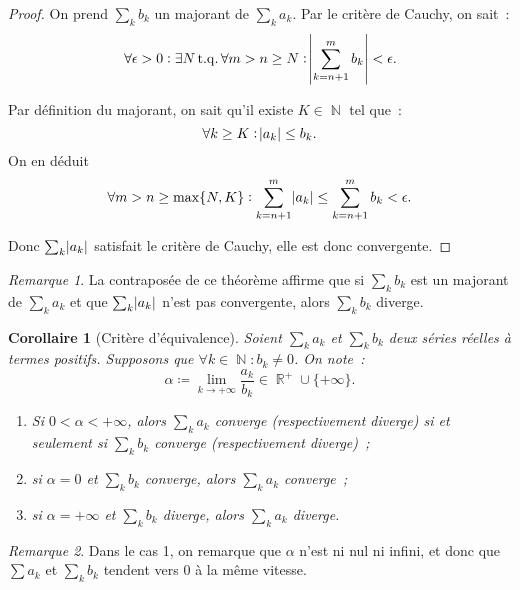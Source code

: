 \documentclass{article}
\DeclareMathOperator{\N}{\mathbb N}
\DeclareMathOperator{\R}{\mathbb R}
\DeclareMathOperator{\tq}{ t.q. }
\newtheorem{cor}[thm]{Corollaire}
\theoremstyle{definition}
\theoremstyle{remark}
\newtheorem*{rmq}{Remarque}
\begin{document}
		\begin{proof} On prend $\sum_k b_k$ un majorant de $\sum_k a_k$. Par le critère de Cauchy, on sait~:
		\[\forall \epsilon > 0 : \exists N \tq \forall m > n \geq N : \abs {\sum_{k=n+1}^m b_k} < \epsilon.\]

		Par définition du majorant, on sait qu'il existe $K \in \N$ tel que~:
		\[\forall k \geq K : \abs {a_k} \leq b_k.\]
		On en déduit
		\[\forall m > n \geq \max \{N, K\} : \sum_{k=n+1}^m \abs {a_k} \leq \sum_{k=n+1}^m b_k < \epsilon.\]

		Donc $\sum_k \abs {a_k}$ satisfait le critère de Cauchy, elle est donc convergente.
		\end{proof}

		\begin{rmq} La contraposée de ce théorème affirme que si $\sum_k b_k$ est un majorant de $\sum_k a_k$ et que $\sum_k \abs{a_k}$ n'est pas convergente,
		alors $\sum_k b_k$ diverge.
		\end{rmq}

		\begin{cor}[Critère d'équivalence] Soient $\sum_k a_k$ et $\sum_k b_k$ deux séries réelles à termes positifs. Supposons que $\forall k \in \N : b_k \neq 0$.
		On note~:
		\[\alpha \coloneqq \lim_{k \to +\infty}\frac {a_k}{b_k} \in \R^+ \cup \{+\infty\}.\]

		\begin{enumerate}
			\item Si $0 < \alpha < +\infty$, alors $\sum_k a_k$ converge (respectivement diverge) si et seulement si $\sum_k b_k$ converge
				(respectivement diverge)~;
			\item si $\alpha = 0$ et $\sum_k b_k$ converge, alors $\sum_k a_k$ converge~;
			\item si $\alpha = +\infty$ et $\sum_k b_k$ diverge, alors $\sum_k a_k$ diverge.
		\end{enumerate}
		\end{cor}

		\begin{rmq} Dans le cas 1, on remarque que $\alpha$ n'est ni nul ni infini, et donc que $\sum a_k$ et $\sum_k b_k$ tendent vers 0 à la même vitesse.
		\end{rmq}
\end{document}
